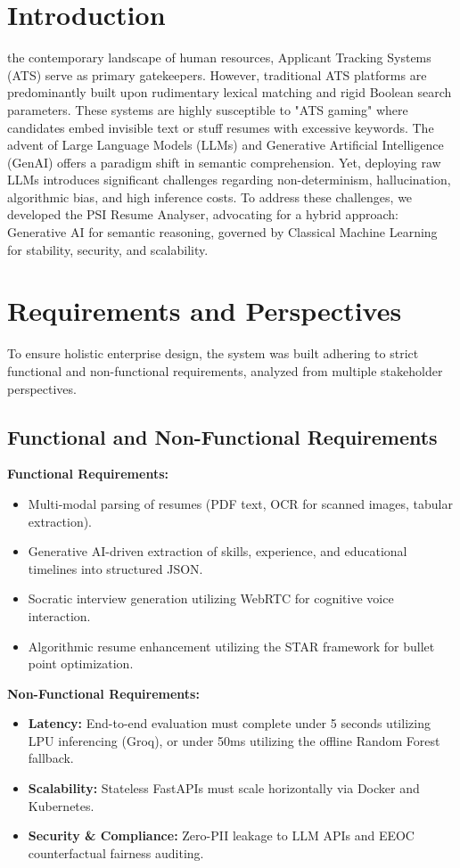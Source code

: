 \documentclass[10pt,journal,compsoc]{IEEEtran}
\begin{document}
\section{Introduction}
 the contemporary landscape of human resources, Applicant Tracking Systems (ATS) serve as primary gatekeepers. However, traditional ATS platforms are predominantly built upon rudimentary lexical matching and rigid Boolean search parameters. These systems are highly susceptible to "ATS gaming" where candidates embed invisible text or stuff resumes with excessive keywords.
The advent of Large Language Models (LLMs) and Generative Artificial Intelligence (GenAI) offers a paradigm shift in semantic comprehension. Yet, deploying raw LLMs introduces significant challenges regarding non-determinism, hallucination, algorithmic bias, and high inference costs. 
To address these challenges, we developed the PSI Resume Analyser, advocating for a hybrid approach: Generative AI for semantic reasoning, governed by Classical Machine Learning for stability, security, and scalability.

\section{Requirements and Perspectives}
To ensure holistic enterprise design, the system was built adhering to strict functional and non-functional requirements, analyzed from multiple stakeholder perspectives.

\subsection{Functional and Non-Functional Requirements}
\textbf{Functional Requirements:}
\begin{itemize}
    \item Multi-modal parsing of resumes (PDF text, OCR for scanned images, tabular extraction).
    \item Generative AI-driven extraction of skills, experience, and educational timelines into structured JSON.
    \item Socratic interview generation utilizing WebRTC for cognitive voice interaction.
    \item Algorithmic resume enhancement utilizing the STAR framework for bullet point optimization.
\end{itemize}

\textbf{Non-Functional Requirements:}
\begin{itemize}
    \item \textbf{Latency:} End-to-end evaluation must complete under 5 seconds utilizing LPU inferencing (Groq), or under 50ms utilizing the offline Random Forest fallback.
    \item \textbf{Scalability:} Stateless FastAPIs must scale horizontally via Docker and Kubernetes.
    \item \textbf{Security \& Compliance:} Zero-PII leakage to LLM APIs and EEOC counterfactual fairness auditing.
\end{itemize}
\end{document}
